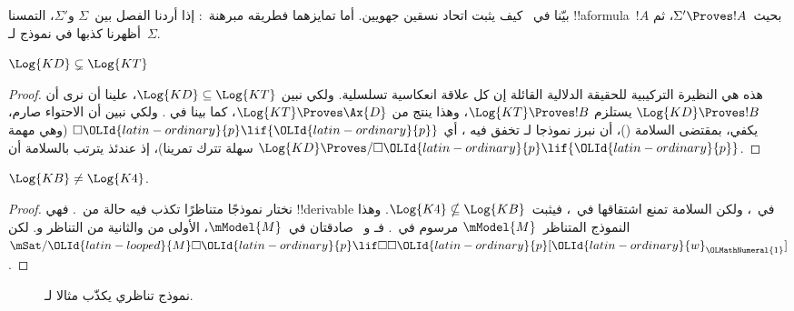 \documentclass[../../../include/open-logic-section]{subfiles}
\begin{document}


بيّنا في~ كيف يثبت اتحاد نسقين جهويين.
أما تمايزهما فطريقه مبرهنة~:
إذا أردنا الفصل بين~$\Sigma$ و$\Sigma'$، التمسنا !!a{formula}~$!A$
بحيث~$\Sigma' \Proves !A$، ثم أظهرنا كذبها في نموذج لـ~$\Sigma$.

\begin{prop}
  $\Log{KD} \subsetneq \Log{KT}$
\end{prop}

\begin{proof} هذه هي النظيرة التركيبية للحقيقة الدلالية القائلة إن كل
  علاقة انعكاسية تسلسلية. ولكي نبين $\Log{KD} \subseteq \Log{KT}$،
  علينا أن نرى أن $\Log{KD} \Proves !B$ يستلزم $\Log{KT} \Proves
  !B$، وهذا ينتج من $\Log{KT} \Proves \Ax{D}$، كما بينا في
  . ولكي نبين
  أن الاحتواء صارم، يكفي، بمقتضى السلامة
  ()، أن نبرز نموذجا لـ تخفق فيه
  ، أي $\Box {\OLId{latin-ordinary}{p}} \lif {\OLId{latin-ordinary}{p}}$ (وهي مهمة سهلة تترك تمرينا)، إذ عندئذ
  يترتب بالسلامة أن $\Log{KD} \Proves/ \Box {\OLId{latin-ordinary}{p}} \lif {\OLId{latin-ordinary}{p}}$.
\end{proof}

\begin{prop}
  $\Log{KB} \neq \Log{K4}$.
\end{prop}

\begin{proof}
  نختار نموذجًا متناظرًا تكذب فيه حالة من~. فهي
  !!{derivable} في~، ولكن السلامة تمنع اشتقاقها
  في~، فيثبت~$\Log{K4} \nsubseteq \Log{KB}$.
  وهذا النموذج المتناظر~$\mModel{M}$ مرسوم في~.
  فـ و~ صادقتان في~$\mModel{M}$، الأولى من
   والثانية من التناظر
  و.
  لكن~$\mSat/{{\OLId{latin-looped}{M}}}{\Box {\OLId{latin-ordinary}{p}} \lif \Box\Box {\OLId{latin-ordinary}{p}}}[{\OLId{latin-ordinary}{w}}_{\OLMathNumeral{1}}]$.
\end{proof}

\begin{figure}[htpb]
  \centering
  \caption{نموذج تناظري يكذّب مثالا لـ.}
\end{figure}
 
\end{document}
